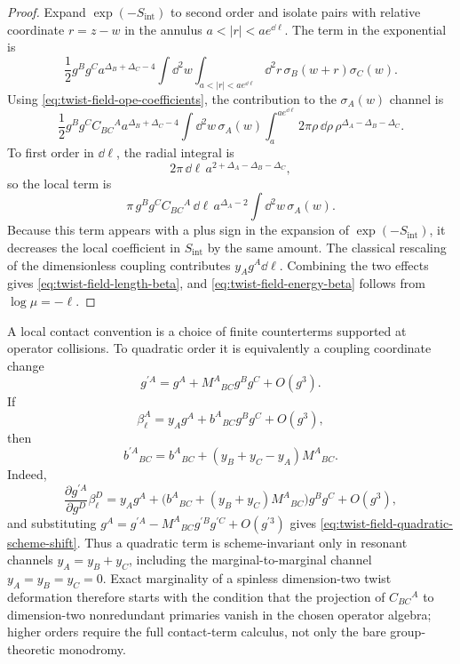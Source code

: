 \begin{proof}
Expand \(\exp(-S_{\mathrm{int}})\) to second order and isolate pairs with
relative coordinate \(r=z-w\) in the annulus \(a<|r|<ae^{\dd\ell}\).  The
term in the exponential is
\[
  \frac12 g^Bg^C a^{\Delta_B+\Delta_C-4}
  \int\dd^2w\int_{a<|r|<ae^{\dd\ell}}\dd^2r\,
  \sigma_B(w+r)\sigma_C(w).
\]
Using \eqref{eq:twist-field-ope-coefficients}, the contribution to the
\(\sigma_A(w)\) channel is
\[
  \frac12 g^Bg^C C_{BC}{}^A
  a^{\Delta_B+\Delta_C-4}
  \int\dd^2w\,\sigma_A(w)
  \int_a^{ae^{\dd\ell}}2\pi\rho\,\dd\rho\,
  \rho^{\Delta_A-\Delta_B-\Delta_C}.
\]
To first order in \(\dd\ell\), the radial integral is
\[
  2\pi\,\dd\ell\,
  a^{2+\Delta_A-\Delta_B-\Delta_C},
\]
so the local term is
\[
  \pi\,g^Bg^C C_{BC}{}^A\,\dd\ell\,
  a^{\Delta_A-2}\int\dd^2w\,\sigma_A(w).
\]
Because this term appears with a plus sign in the expansion of
\(\exp(-S_{\mathrm{int}})\), it decreases the local coefficient in
\(S_{\mathrm{int}}\) by the same amount.  The classical rescaling of the
dimensionless coupling contributes \(y_Ag^A\dd\ell\).  Combining the two
effects gives \eqref{eq:twist-field-length-beta}, and
\eqref{eq:twist-field-energy-beta} follows from \(\log\mu=-\ell\).
\end{proof}

\begin{remark}
\label{rem:twist-field-contact-scheme}
A local contact convention is a choice of finite counterterms supported at
operator collisions.  To quadratic order it is equivalently a coupling
coordinate change
\[
  g^{\prime A}=g^A+M^A{}_{BC}g^Bg^C+O(g^3).
\]
If
\[
  \beta_\ell^A=y_Ag^A+b^A{}_{BC}g^Bg^C+O(g^3),
\]
then
\begin{equation}
  b^{\prime A}{}_{BC}
  =
  b^A{}_{BC}
  +(y_B+y_C-y_A)M^A{}_{BC}.
  \label{eq:twist-field-quadratic-scheme-shift}
\end{equation}
Indeed,
\[
  \frac{\partial g^{\prime A}}{\partial g^D}\beta_\ell^D
  =
  y_Ag^A+
  \bigl(b^A{}_{BC}+(y_B+y_C)M^A{}_{BC}\bigr)g^Bg^C
  +O(g^3),
\]
and substituting \(g^A=g^{\prime A}-M^A{}_{BC}g^{\prime B}g^{\prime C}
+O(g^{\prime3})\) gives \eqref{eq:twist-field-quadratic-scheme-shift}.
Thus a quadratic term is scheme-invariant only in resonant channels
\(y_A=y_B+y_C\), including the marginal-to-marginal channel
\(y_A=y_B=y_C=0\).  Exact marginality of a spinless dimension-two twist
deformation therefore starts with the condition that the projection of
\(C_{BC}{}^A\) to dimension-two nonredundant primaries vanish in the chosen
operator algebra; higher orders require the full contact-term calculus, not
only the bare group-theoretic monodromy.
\end{remark}

